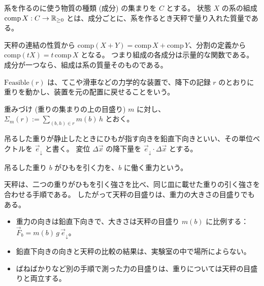 \begin{definition}[組成]
  \label{def:mass}
  \leanok
  系を作るのに使う物質の種類 (成分) の集まりを $C$ とする。
  状態 $X$ の系の組成 $\mathrm{comp}\, X : C \to \mathbb{R}_{\ge 0}$ とは、成分ごとに、系を作るとき天秤で量り入れた質量である。
\end{definition}

天秤の連結の性質から $\mathrm{comp}(X + Y) = \mathrm{comp}\, X + \mathrm{comp}\, Y$、分割の定義から $\mathrm{comp}(tX) = t\, \mathrm{comp}\, X$ となる。
つまり組成の各成分は示量的な関数である。
成分が一つなら、組成は系の質量そのものである。

\begin{definition}[力学的に実現できる記録]
  \label{def:feasible}
  \leanok
  $\mathrm{Feasible}(r)$ は、てこや滑車などの力学的な装置で、降下の記録 $r$ のとおりに重りを動かし、装置を元の配置に戻せることをいう。
\end{definition}

\begin{definition}[重みつき和]
  \label{def:weighted-sum}
  \leanok
  重みづけ (重りの集まりの上の目盛り) $m$ に対し、$\Sigma_m(r) := \sum_{(b, h) \in r} m(b)\, h$ とおく。
\end{definition}

\begin{definition}[鉛直下向き]
  \label{def:down}
  \leanok
  吊るした重りが静止したときにひもが指す向きを鉛直下向きといい、その単位ベクトルを $\vec e_{\downarrow}$ と書く。
  変位 $\Delta \vec x$ の降下量を $\vec e_{\downarrow} \cdot \Delta \vec x$ とする。
\end{definition}

\begin{definition}[重力]
  \label{def:gravity}
  \leanok
  吊るした重り $b$ がひもを引く力を、$b$ に働く重力という。
\end{definition}

天秤は、二つの重りがひもを引く強さを比べ、同じ皿に載せた重りの引く強さを合わせる手順である。
したがって天秤の目盛りは、重力の大きさの目盛りでもある。

\begin{empirical}[重力の法則]
  \label{emp:gravity}
  \begin{itemize}
    \item 重力の向きは鉛直下向きで、大きさは天秤の目盛り $m(b)$ に比例する：$\vec F_b = m(b)\, g\, \vec e_{\downarrow}$。
    \item 鉛直下向きの向きと天秤の比較の結果は、実験室の中で場所によらない。
    \item ばねばかりなど別の手順で測った力の目盛りは、重りについては天秤の目盛りと両立する。
  \end{itemize}
\end{empirical}

